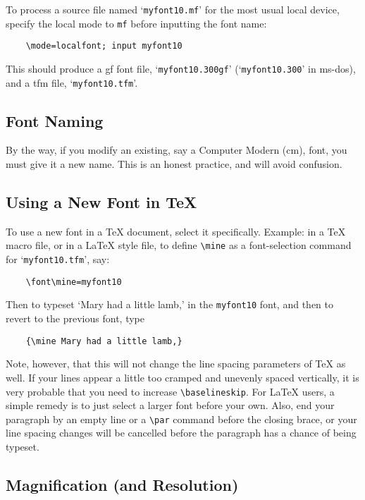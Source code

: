 To process a \MF{} source file named `{\tt myfont10.mf}' for the most
usual local device, specify the local mode to {\tt mf} before
inputting the font name:
\begin{verbatim}
    \mode=localfont; input myfont10
\end{verbatim}
This should produce a {\sc gf} font file, `{\tt myfont10.300gf}'
(`{\tt myfont10.300}' in {\sc ms-dos}),
and a {\sc tfm} file, `{\tt myfont10.tfm}'.


\subsection{Font Naming}\label{sub:naming}

By the way, if you modify an existing, say a {\sc Computer
Modern (cm)}, font, you must give it a new name.  This is an honest
practice, and will avoid confusion.


\subsection{Using a New Font in \TeX{}}\label{sub:tex}

To use a new font in a \TeX{} document, select it specifically.
Example:  in a \TeX{} macro file, or in a \LaTeX{} style file,
to define \verb+\mine+ as a font-selection command for
`{\tt myfont10.tfm}', say:
\begin{verbatim}
    \font\mine=myfont10
\end{verbatim}

Then to typeset `Mary had a little lamb,' in the {\tt myfont10} font,
and then to revert to the previous font, type
\begin{verbatim}
    {\mine Mary had a little lamb,}
\end{verbatim}
Note, however, that this will not change the line spacing parameters
of \TeX{} as
well. If your lines appear a little too cramped and unevenly spaced vertically,
it is very probable that you need to increase \verb+\baselineskip+.
For \LaTeX{} users, a simple remedy is to just select a larger font
before your own.  Also, end your paragraph by an empty line or a
\verb+\par+ command before the closing brace, or your line spacing changes
will be cancelled before the paragraph has a chance of being typeset.


\subsection{Magnification (and Resolution)}\label{sub:mag}

